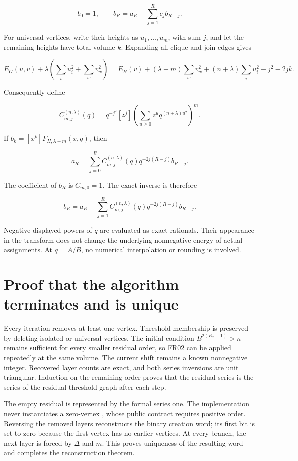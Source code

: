 \documentclass[
  11pt,
  a4paper,
]{report}
\let\singularitytexttt\texttt
\renewcommand{\texttt}[1]{\singularitytexttt{\seqsplit{#1}}}
\begin{document}
\[
 b_0=1,\qquad
 b_R=a_R-\sum_{j=1}^R c_jb_{R-j}.
\]

For universal vertices, write their heights as \(u_1,\ldots,u_m\), with
sum \(j\), and let the remaining heights have total volume \(k\).
Expanding all clique and join edges gives

\[
 E_G(u,v)+\lambda(\sum_i u_i^2+\sum_wv_w^2)
 =E_H(v)+(\lambda+m)\sum_wv_w^2
 +(n+\lambda)\sum_i u_i^2-j^2-2jk.
\]

Consequently define

\[
 C_{m,j}^{(n,\lambda)}(q)
 =q^{-j^2}[z^j]\left(\sum_{u\ge0}z^u q^{(n+\lambda)u^2}\right)^m.
\]

If \(b_k=[x^k]F_{H,\lambda+m}(x,q)\), then

\[
 a_R=\sum_{j=0}^R C_{m,j}^{(n,\lambda)}(q)
 q^{-2j(R-j)}b_{R-j}.
\]

The coefficient of \(b_R\) is \(C_{m,0}=1\). The exact inverse is
therefore

\[
 b_R=a_R-\sum_{j=1}^R C_{m,j}^{(n,\lambda)}(q)
 q^{-2j(R-j)}b_{R-j}.
\]

Negative displayed powers of \(q\) are evaluated as exact rationals.
Their appearance in the transform does not change the underlying
nonnegative energy of actual assignments. At \(q=A/B\), no numerical
interpolation or rounding is involved.

\hypertarget{proof-that-the-algorithm-terminates-and-is-unique}{%
\section{Proof that the algorithm terminates and is
unique}\label{proof-that-the-algorithm-terminates-and-is-unique}}

Every iteration removes at least one vertex. Threshold membership is
preserved by deleting isolated or universal vertices. The initial
condition \(B^{2(R_*-1)}>n\) remains sufficient for every smaller
residual order, so FR02 can be applied repeatedly at the same volume.
The current shift remains a known nonnegative integer. Recovered layer
counts are exact, and both series inversions are unit triangular.
Induction on the remaining order proves that the residual series is the
series of the residual threshold graph after each step.

The empty residual is represented by the formal series one. The
implementation never instantiates a zero-vertex \texttt{Graph}, whose
public contract requires positive order. Reversing the removed layers
reconstructs the binary creation word; its first bit is set to zero
because the first vertex has no earlier vertices. At every branch, the
next layer is forced by \(\Delta\) and \(m\). This proves uniqueness of
the resulting word and completes the reconstruction theorem.
\end{document}
